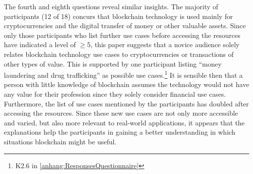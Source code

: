 The fourth and eighth questions reveal similar insights. The majority of participants (12 of 18) concurs that blockchain technology is used mainly for cryptocurrencies and the digital transfer of money or other valuable assets. Since only those participants who list further use cases before accessing the resources have indicated a level of $\geq$5, this paper suggests that a novice audience solely relates blockchain technology use cases to cryptocurrencies or transactions of other types of value. This is supported by one participant listing \enquote{money laundering and drug trafficking} as possible use cases.\footnote{K2.6 in \ref{anhang:ResponsesQuestionnaire}} It is sensible then that a person with little knowledge of blockchain assumes the technology would not have any value for their profession since they solely consider financial use cases. Furthermore, the list of use cases mentioned by the participants has doubled after accessing the resources. Since these new use cases are not only more accessible and varied, but also more relevant to real-world applications, it appears that the explanations help the participants in gaining a better understanding in which situations blockchain might be useful.


